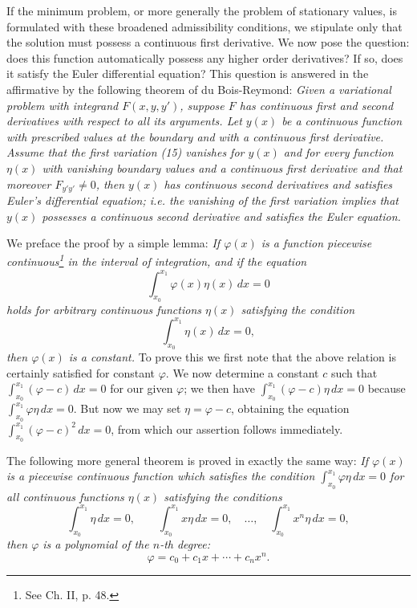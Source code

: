 If the minimum problem, or more generally the problem of stationary values, is formulated with these broadened admissibility conditions, we stipulate only that the solution must possess a continuous first derivative. We now pose the question: does this function automatically possess any higher order derivatives? If so, does it satisfy the Euler differential equation? This question is answered in the affirmative by the following theorem of du Bois-Reymond: \emph{Given a variational problem with integrand $F(x,y,y')$, suppose $F$ has continuous first and second derivatives with respect to all its arguments. Let $y(x)$ be a continuous function with prescribed values at the boundary and with a continuous first derivative. Assume that the first variation (15) vanishes for $y(x)$ and for every function $\eta(x)$ with vanishing boundary values and a continuous first derivative and that moreover $F_{y'y'}\ne0$, then $y(x)$ has continuous second derivatives and satisfies Euler's differential equation; i.e. the vanishing of the first variation implies that $y(x)$ possesses a continuous second derivative and satisfies the Euler equation.}

We preface the proof by a simple lemma: \emph{If $\varphi(x)$ is a function piecewise continuous\footnote{See Ch. II, p. 48.} in the interval of integration, and if the equation
\[
\int_{x_0}^{x_1}\varphi(x)\eta(x)\,dx=0
\]
holds for arbitrary continuous functions $\eta(x)$ satisfying the condition
\[
\int_{x_0}^{x_1}\eta(x)\,dx=0,
\]
then $\varphi(x)$ is a constant.} To prove this we first note that the above relation is certainly satisfied for constant $\varphi$. We now determine a constant $c$ such that $\int_{x_0}^{x_1}(\varphi-c)\,dx=0$ for our given $\varphi$; we then have $\int_{x_0}^{x_1}(\varphi-c)\eta\,dx=0$ because $\int_{x_0}^{x_1}\varphi\eta\,dx=0$. But now we may set $\eta=\varphi-c$, obtaining the equation $\int_{x_0}^{x_1}(\varphi-c)^2\,dx=0$, from which our assertion follows immediately.

The following more general theorem is proved in exactly the same way: \emph{If $\varphi(x)$ is a piecewise continuous function which satisfies the condition $\int_{x_0}^{x_1}\varphi\eta\,dx=0$ for all continuous functions $\eta(x)$ satisfying the conditions
\[
\int_{x_0}^{x_1}\eta\,dx=0,
\qquad
\int_{x_0}^{x_1}x\eta\,dx=0,
\quad\ldots,\quad
\int_{x_0}^{x_1}x^n\eta\,dx=0,
\]
then $\varphi$ is a polynomial of the $n$-th degree:}
\[
\varphi=c_0+c_1x+\cdots+c_nx^n.
\]

